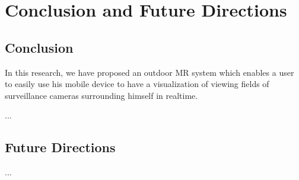 \chapter{Conclusion and Future Directions}
\label{Chapter6}

\section{Conclusion}

In this research, we have proposed an outdoor MR system which enables a user to easily use his mobile device to have a visualization of viewing fields of surveillance cameras surrounding himself in realtime.

...

\section{Future Directions}

...

